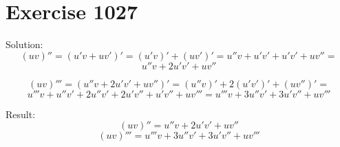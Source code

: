 \documentclass[a4paper, 10pt]{scrartcl}
\begin{document}
\section{Exercise 1027}

Solution:
\[
(uv)'' = (u'v + uv')' = (u'v)' + (uv')' = u''v + u'v' + u'v' + uv'' =
\]
\[
u''v + 2u'v' + uv''
\]

\[
(uv)''' = (u''v + 2u'v' + uv'')' = (u''v)' + 2(u'v')' + (uv'')' =
\]
\[
u'''v + u''v' + 2u''v' + 2u'v'' + u'v'' + uv''' = u'''v + 3u''v' + 3u'v'' + uv'''
\]

Result:
\[
(uv)'' = u''v + 2u'v' + uv''
\]
\[
(uv)''' = u'''v + 3u''v' + 3u'v'' + uv'''
\]
\end{document}
